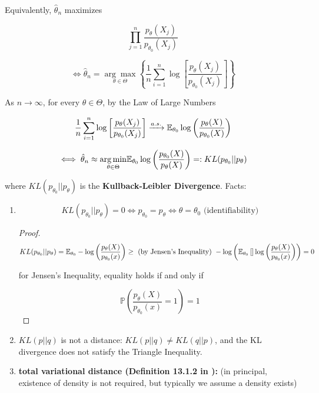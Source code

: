 \begin{remark}

Equivalently, \(\hat{\theta}_n\) maximizes

\[
\prod_{j=1}^n \frac{ p_\theta(X_j)}{p_{\theta_0}(X_j)}
\]

\[
\iff \hat{\theta}_n = \underset{\theta \in \Theta}{\arg \max} \left\{  \frac{1}{n} \sum_{i=1}^n \log  \left[  \frac{ p_\theta(X_j)}{p_{\theta_0} (X_j)} \right] \right\}
\]

As \(n \to \infty\), for every \(\theta \in \Theta\), by the Law of Large Numbers

\[
 \frac{1}{n} \sum_{i=1}^n \log  \left[  \frac{ p_\theta(X_j)}{p_{\theta_0} (X_j)} \right]  \xrightarrow{a.s.} \E_{\theta_0} \log \left(  \frac{p_\theta(X) }{ p_{\theta_0}(X)} \right)
\]

\[
\iff \hat{\theta}_n \approx  \underset{\theta \in \Theta}{\arg \min} \E_{\theta_0} \log \left(  \frac{p_{\theta_0} (X) } {p_{\theta}(X)}\right) =: KL(p_{\theta_0} || p_\theta)
\]

where \(KL(p_{\theta_0} || p_\theta)\) is the \textbf{Kullback-Leibler Divergence}. Facts:

\begin{enumerate}

\item 

\[
KL(p_{\theta_0} || p_\theta) = 0 \iff  p_{\theta_0} = p_\theta \iff \theta = \theta_0 \text{ (identifiability)}
\]

\begin{proof}

\[
KL(p_{\theta_0} || p_\theta) = \E_{\theta_0} - \log \left( \frac{ p_\theta(X)}{p_{\theta_0}(x)}  \right) \geq \text{ (by Jensen's Inequality) }  - \log \left( \E_{\theta_0} \left[ \right] \log \left( \frac{ p_\theta(X)}{p_{\theta_0}(x)}  \right) \right) = 0
\]

for Jensen's Inequality, equality holds if and only if 

\[
\mathbb{P}\left(\frac{ p_\theta(X)}{p_{\theta_0}(x)} = 1 \right) = 1
\]

\end{proof}

\item \(KL(p  || q ) \) is not a distance: \(KL(p  || q ) \neq KL(q || p)
\), and the KL divergence does not satisfy the Triangle Inequality.

\item  \textbf{total variational distance (Definition 13.1.2 in \citet{lehmann2005testing}):} (in principal, existence of density is not required, but typically we assume a density exists)


\end{enumerate}
\end{remark}
